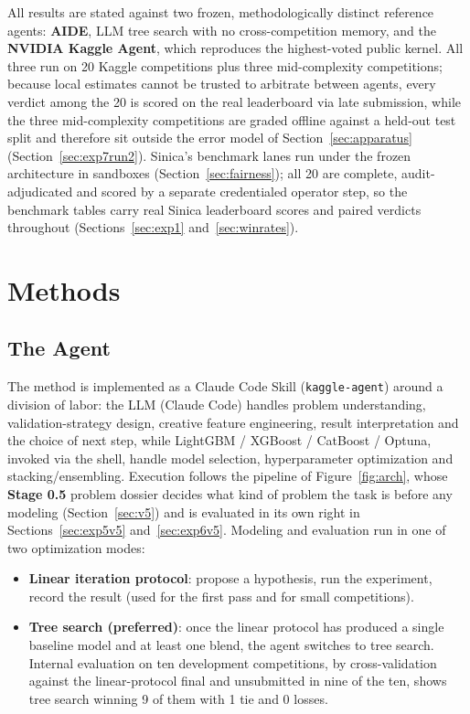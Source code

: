 \documentclass[11pt,a4paper]{article}
\begin{document}
All results are stated against two frozen, methodologically distinct reference agents: \textbf{AIDE}, LLM tree search with no cross-competition memory, and the \textbf{NVIDIA Kaggle Agent}, which reproduces the highest-voted public kernel. All three run on 20 Kaggle competitions plus three mid-complexity competitions; because local estimates cannot be trusted to arbitrate between agents, every verdict among the 20 is scored on the real leaderboard via late submission, while the three mid-complexity competitions are graded offline against a held-out test split and therefore sit outside the error model of Section~\ref{sec:apparatus} (Section~\ref{sec:exp7run2}). Sinica's benchmark lanes run under the frozen architecture in sandboxes (Section~\ref{sec:fairness}); all 20 are complete, audit-adjudicated and scored by a separate credentialed operator step, so the benchmark tables carry real Sinica leaderboard scores and paired verdicts throughout (Sections~\ref{sec:exp1} and~\ref{sec:winrates}).

\section{Methods}

\subsection{The Agent}

The method is implemented as a Claude Code Skill (\texttt{kaggle-agent}) around a division of labor: the LLM (Claude Code) handles problem understanding, validation-strategy design, creative feature engineering, result interpretation and the choice of next step, while LightGBM / XGBoost / CatBoost / Optuna, invoked via the shell, handle model selection, hyperparameter optimization and stacking/ensembling. Execution follows the pipeline of Figure~\ref{fig:arch}, whose \textbf{Stage 0.5} problem dossier decides what kind of problem the task is before any modeling (Section~\ref{sec:v5}) and is evaluated in its own right in Sections~\ref{sec:exp5v5} and~\ref{sec:exp6v5}. Modeling and evaluation run in one of two optimization modes:

\begin{itemize}[leftmargin=*]
  \item \textbf{Linear iteration protocol}: propose a hypothesis, run the experiment, record the result (used for the first pass and for small competitions).
  \item \textbf{Tree search (preferred)}: once the linear protocol has produced a single baseline model and at least one blend, the agent switches to tree search. Internal evaluation on ten development competitions, by cross-validation against the linear-protocol final and unsubmitted in nine of the ten, shows tree search winning 9 of them with 1 tie and 0 losses.
\end{itemize}
\end{document}
